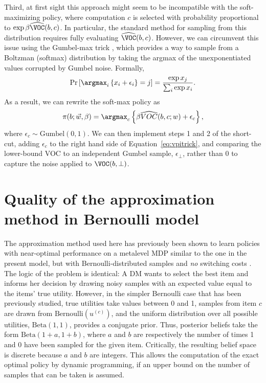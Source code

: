 Third, at first sight this approach might seem to be incompatible with the soft-maximizing policy, where computation $c$ is selected with probability proportional to $\exp\beta\widehat{\VOC}(b,c)$. In particular, the standard method for sampling from this distribution requires fully evaluating $\widehat{\VOC}(b,c)$. However, we can circumvent this issue using the Gumbel-max trick \citep{yellott1977relationship}, which provides a way to sample from a Boltzman (softmax) distribution by taking the argmax of the unexponentiated values corrupted by Gumbel noise. Formally,
%
\begin{equation*}
  \Pr\left[\argmax_{i}\left\{ x_{i}+\epsilon_{i}\right\} =j\right]=\frac{\exp x_{j}}{\sum_{i}\exp x_{i}}.
\end{equation*}
%
As a result, we can rewrite the soft-max policy as 
%
\begin{equation*}
  \pi(b;\vec{w},\beta)=\argmax_{c}\left\{ \beta\widehat{VOC}(b,c;w)+\epsilon_{c}\right\} ,
\end{equation*}
%
where $\epsilon_{c}\sim\text{Gumbel}(0,1)$. We can then implement steps 1 and 2 of the short-cut, adding $\epsilon_{c}$ to the right hand side of Equation~\ref{eq:vpitrick}, and comparing the lower-bound VOC to an independent Gumbel sample, $\epsilon_\bot$, rather than 0 to capture the noise applied to $\VOC(b,\bot)$.



\section{Quality of the approximation method in Bernoulli model}\label{app:attention-bernoulli}

The approximation method used here has previously been shown to learn policies with near-optimal performance on a metalevel MDP similar to the one in the present model, but with Bernoulli-distributed samples and \emph{no} switching costs \citep{callaway2018learning}. The logic of the problem is identical: A DM wants to select the best item and informs her decision by drawing noisy samples with an expected value  equal to the items' true utility. However, in the simpler Bernoulli case that has been previously studied, true utilities take values between 0 and 1, samples from item $c$ are drawn from $\text{Bernoulli}(u^{(c)})$,  and the  uniform distribution over all possible utilities, $\text{Beta}(1, 1)$, provides a conjugate prior. Thus, posterior beliefs take the form $\text{Beta}(1+a, 1+b)$, where $a$ and $b$ are respectively the number of times 1 and 0 have been sampled for the given item.  Critically, the resulting belief space is discrete because $a$ and $b$ are integers. This allows the computation of the exact optimal policy by dynamic programming, if an upper bound on the number of samples that can be taken is assumed. 

